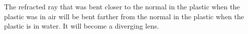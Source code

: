 The refracted ray that was bent closer to the normal in
the plastic when the plastic was in air will be bent farther
from the normal in the plastic when the plastic is in water.
It will become a diverging lens.
